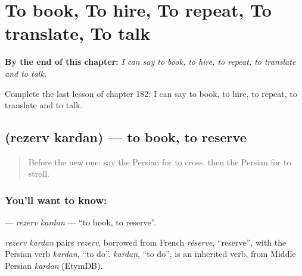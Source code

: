 
\chapter{To book, To hire, To repeat, To translate, To talk}
\label{ch:fa-to-book-to-hire-to-repeat-to-translate-to-talk}

\begin{chapteropening}
\textbf{By the end of this chapter:} \emph{I can say to book, to hire, to repeat, to translate and to talk.}

Complete the last lesson of chapter 182: I can say to book, to hire, to repeat, to translate and to talk.
\end{chapteropening}

\section[\texorpdfstring{\fa{رزرو} \fa{کردن} (rezerv kardan)}{رزرو کردن (rezerv kardan)}]{  (rezerv kardan) — to book, to reserve}

\label{lesson:FA-C182-rezerv-kardan}



\begin{quote}
Before the new one: say the Persian for to cross, then the Persian for to stroll.
\end{quote}

\subsection*{You'll want to know:  }
\textbf{ } — \emph{rezerv kardan} — \textquotedblleft{}to book, to reserve\textquotedblright{}.

\begin{cousinweb}
\emph{rezerv kardan} pairs \emph{rezerv}, borrowed from French \emph{réserve}, \textquotedblleft{}reserve\textquotedblright{}, with the Persian verb \emph{kardan}, \textquotedblleft{}to do\textquotedblright{}. \emph{kardan}, \textquotedblleft{}to do\textquotedblright{}, is an inherited verb, from Middle Persian \emph{kardan} (EtymDB).
\end{cousinweb}

